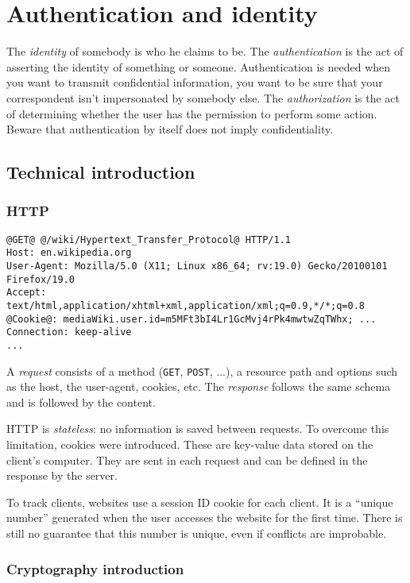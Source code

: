 \section{Authentication and identity}

The \emph{identity} of somebody is who he claims to be.
The \emph{authentication} is the act of asserting the identity of something or
someone.
Authentication is needed when you want to transmit confidential
information, you want to be sure that your correspondent isn't
impersonated by somebody else.
The \emph{authorization} is the act of determining whether the user has the
permission to perform some action.
Beware that authentication by itself does not imply confidentiality.

\subsection{Technical introduction}

\subsubsection*{HTTP}

\begin{lstlisting}[style=beamer]
@GET@ @/wiki/Hypertext_Transfer_Protocol@ HTTP/1.1
Host: en.wikipedia.org
User-Agent: Mozilla/5.0 (X11; Linux x86_64; rv:19.0) Gecko/20100101 Firefox/19.0
Accept: text/html,application/xhtml+xml,application/xml;q=0.9,*/*;q=0.8
@Cookie@: mediaWiki.user.id=m5MFt3bI4Lr1GcMvj4rPk4mwtwZqTWhx; ...
Connection: keep-alive
...
\end{lstlisting}

A \emph{request} consists of a method (\texttt{GET}, \texttt{POST}, ...), a
resource path and options such as the host, the user-agent, cookies, etc.
The \emph{response} follows the same schema and is followed by the content.

HTTP is \emph{stateless}: no information is saved between requests.
To overcome this limitation, cookies were introduced. These are key-value data
stored on the client's computer. They are sent in each request and can be
defined in the response by the server.

To track clients, websites use a session ID cookie for each client.
It is a ``unique number'' generated when the user accesses the website for the
first time. There is still no guarantee that this number is unique, even if
conflicts are improbable.
\newline
\subsubsection*{Cryptography introduction}

